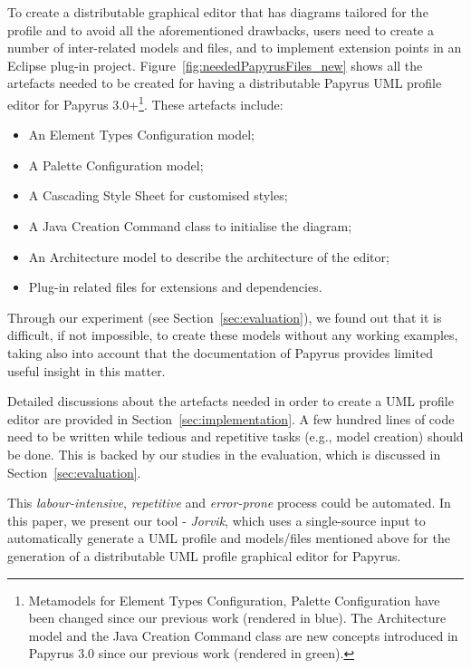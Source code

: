 To create a distributable graphical editor that has diagrams tailored for the profile and to avoid all the aforementioned drawbacks, users need to create a number of inter-related models and files, and to implement extension points in an Eclipse plug-in project. 
Figure~\ref{fig:neededPapyrusFiles_new} shows all the artefacts needed to be created for having a distributable Papyrus UML profile editor for Papyrus 3.0+\footnote{Metamodels for Element Types Configuration, Palette Configuration have been changed since our previous work (rendered in blue).	The Architecture model and the Java Creation Command class are new concepts introduced in Papyrus 3.0 since our previous work (rendered in green).}.
These artefacts include:
\begin{itemize}
	\item An Element Types Configuration model;
	\item A Palette Configuration model;
	\item A Cascading Style Sheet for customised styles;
	\item A Java Creation Command class to initialise the diagram;
	\item An Architecture model to describe the architecture of the editor;
	\item Plug-in related files for extensions and dependencies.
\end{itemize}


Through our experiment (see Section~\ref{sec:evaluation}), we found out that it is difficult, if not impossible, to create these models without any working examples, taking also into account that the documentation of Papyrus provides limited useful insight in this matter.

Detailed discussions about the artefacts needed in order to create a UML profile editor are provided in Section~\ref{sec:implementation}.
A few hundred lines of code need to be written while tedious and repetitive tasks (e.g., model creation) should be done. 
This is backed by our studies in the evaluation, which is discussed in Section~\ref{sec:evaluation}.

This \textit{labour-intensive}, \textit{repetitive} and \textit{error-prone} process could be automated. 
In this paper, we present our tool - \textit{Jorvik}, which uses a single-source input to automatically generate a UML profile and models/files mentioned above for the generation of a distributable UML profile graphical editor for Papyrus. 
